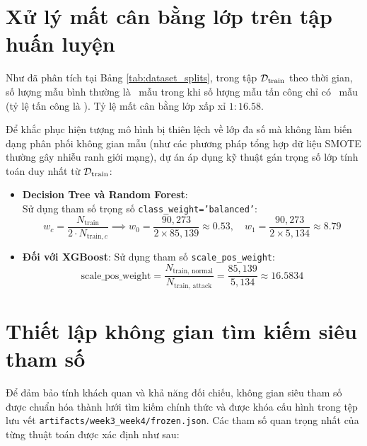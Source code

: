 \section{Xử lý mất cân bằng lớp trên tập huấn luyện}

Như đã phân tích tại Bảng \ref{tab:dataset_splits}, trong tập $\mathcal{D}_{\text{train}}$ theo thời gian, số lượng mẫu bình thường là \DataTrainBenign\ mẫu trong khi số lượng mẫu tấn công chỉ có \DataTrainAttack\ mẫu (tỷ lệ tấn công là \DataTrainAttackPercent). Tỷ lệ mất cân bằng lớp xấp xỉ $1 : 16.58$.

Để khắc phục hiện tượng mô hình bị thiên lệch về lớp đa số mà không làm biến dạng phân phối không gian mẫu (như các phương pháp tổng hợp dữ liệu SMOTE thường gây nhiễu ranh giới mạng), dự án áp dụng kỹ thuật gán trọng số lớp tính toán duy nhất từ $\mathcal{D}_{\text{train}}$:
\begin{itemize}
    \item \textbf{Decision Tree và Random Forest}:\\
    Sử dụng tham số trọng số \texttt{class\_weight='balanced'}:
    \begin{equation}
        w_c = \frac{N_{\text{train}}}{2 \cdot N_{\text{train}, c}} \implies w_0 = \frac{90,273}{2 \times 85,139} \approx 0.53, \quad w_1 = \frac{90,273}{2 \times 5,134} \approx 8.79
    \end{equation}
    \item \textbf{Đối với XGBoost}: Sử dụng tham số \texttt{scale\_pos\_weight}:
    \begin{equation}
        \text{scale\_pos\_weight} = \frac{N_{\text{train, normal}}}{N_{\text{train, attack}}} = \frac{85,139}{5,134} \approx 16.5834
    \end{equation}
\end{itemize}

\section{Thiết lập không gian tìm kiếm siêu tham số}

Để đảm bảo tính khách quan và khả năng đối chiếu, không gian siêu tham số được chuẩn hóa thành lưới tìm kiếm chính thức và được khóa cấu hình trong tệp lưu vết \texttt{artifacts/week3\_week4/frozen.json}. Các tham số quan trọng nhất của từng thuật toán được xác định như sau:

